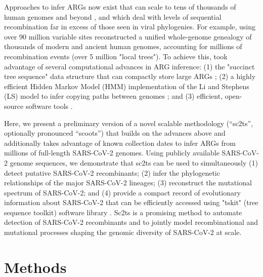 \documentclass{article}
\begin{document}
Approaches to infer ARGs now exist that can scale to tens of thousands of human genomes and beyond  \citep{Speidel2019-yh,Kelleher2019-ba,Zhang2021-lf,Schaefer2021-yg}, and which deal with levels of sequential recombination far in excess of those seen in viral phylogenies. For example, using over 90 million variable sites \citet{Wohns2022-th} reconstructed a unified whole-genome genealogy of thousands of modern and ancient human genomes, accounting for millions of recombination events (over 5 million "local trees"). To achieve this, \cite{Wohns2022-th} took advantage of several computational advances in ARG inference: (1) the "succinct tree sequence" data structure that can compactly store large ARGs \citep{Kelleher2018-xc}; (2) a highly efficient Hidden Markov Model (HMM) implementation of the Li and Stephens (LS) model \citep{Li2003-ib} to infer copying paths between genomes \citep{Kelleher2019-ba}; and (3) efficient, open-source software tools \citep{Baumdicker2022-ep,Kelleher2018-xc,Kelleher2019-ba,Wohns2022-th}.

Here, we present a preliminary version of a novel scalable methodology
(``sc2ts'', optionally pronounced ``scoots'') that builds on the advances above and additionally takes advantage of known collection dates to infer ARGs from millions of full-length SARS-CoV-2 genomes. Using publicly available SARS-CoV-2 genome sequences, we demonstrate that sc2ts can be used to simultaneously (1) detect putative SARS-CoV-2 recombinants; (2) infer the phylogenetic relationships of the major SARS-CoV-2 lineages; (3) reconstruct the mutational spectrum of SARS-CoV-2; and (4) provide a compact record of evolutionary information about SARS-CoV-2 that can be efficiently accessed using "tskit" (tree sequence toolkit) software library \citep{Kelleher2018-xc}. Sc2ts is a promising method to automate detection of SARS-CoV-2 recombinants and to jointly model recombinational and mutational processes shaping the genomic diversity of SARS-CoV-2 at scale.

\section{Methods}
\end{document}

